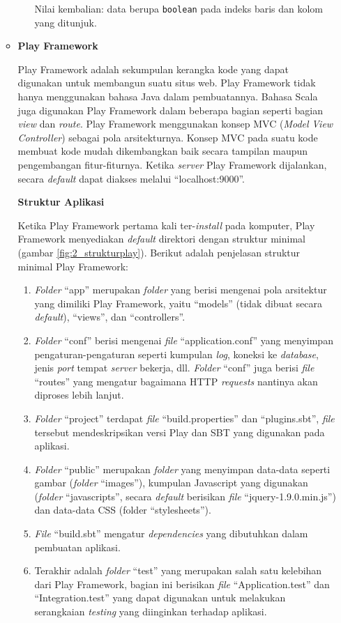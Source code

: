 \documentclass[a4paper,twoside]{article}
\begin{document}
\begin{enumerate}
\begin{itemize}
\begin{itemize}
	Nilai kembalian: data berupa \texttt{boolean} pada indeks baris dan kolom yang ditunjuk.
\end{itemize}



\item \textbf{Play Framework}

Play Framework adalah sekumpulan kerangka kode yang dapat digunakan untuk membangun suatu situs web\cite{playforjava}. Play Framework tidak hanya menggunakan bahasa Java dalam pembuatannya. Bahasa Scala juga digunakan Play Framework dalam beberapa bagian seperti bagian \textit{view} dan \textit{route}. Play Framework menggunakan konsep MVC (\textit{Model} \textit{View} \textit{Controller}) sebagai pola arsitekturnya. Konsep MVC pada suatu kode membuat kode mudah dikembangkan baik secara tampilan maupun pengembangan fitur-fiturnya. Ketika \textit{server} Play Framework dijalankan, secara \textit{default} dapat diakses melalui ``localhost:9000''.

\textbf{Struktur Aplikasi}

Ketika Play Framework pertama kali ter-\textit{install} pada komputer, Play Framework menyediakan \textit{default} direktori dengan struktur minimal (gambar \ref{fig:2_strukturplay}). Berikut adalah penjelasan struktur minimal Play Framework:
\begin{enumerate}
	\item \textit{Folder} ``app'' merupakan \textit{folder} yang berisi mengenai pola arsitektur yang dimiliki Play Framework, yaitu ``models'' (tidak dibuat secara \textit{default}), ``views'', dan ``controllers''.
	\item \textit{Folder} ``conf'' berisi mengenai \textit{file} ``application.conf'' yang menyimpan pengaturan-pengaturan seperti kumpulan \textit{log}, koneksi ke \textit{database}, jenis \textit{port} tempat \textit{server} bekerja, dll. \textit{Folder} ``conf'' juga berisi \textit{file} ``routes'' yang mengatur bagaimana HTTP \textit{requests} nantinya akan diproses lebih lanjut.
	\item \textit{Folder} ``project'' terdapat \textit{file} ``build.properties'' dan ``plugins.sbt'', \textit{file} tersebut mendeskripsikan versi Play dan SBT yang digunakan pada aplikasi.
	\item \textit{Folder} ``public'' merupakan \textit{folder} yang menyimpan data-data seperti gambar (\textit{folder} ``images''), kumpulan Javascript yang digunakan (\textit{folder} ``javascripts'', secara \textit{default} berisikan \textit{file} ``jquery-1.9.0.min.js'') dan data-data CSS (folder ``stylesheets'').
	\item \textit{File} ``build.sbt'' mengatur \textit{dependencies} yang dibutuhkan dalam pembuatan aplikasi.
	\item Terakhir adalah \textit{folder} ``test'' yang merupakan salah satu kelebihan dari Play Framework, bagian ini berisikan \textit{file} ``Application.test'' dan ``Integration.test'' yang dapat digunakan untuk melakukan serangkaian \textit{testing} yang diinginkan terhadap aplikasi.
\end{enumerate}
     


\end{itemize}
\end{enumerate}
\end{document}
